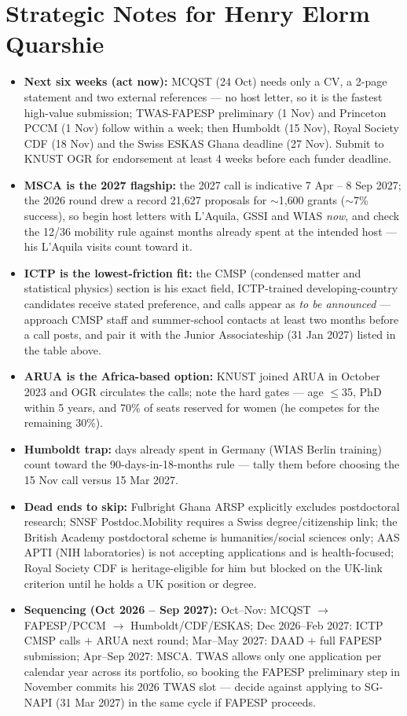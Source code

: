\documentclass[11pt,a4paper]{article}
\begin{document}
\section{Strategic Notes for Henry Elorm Quarshie}

\begin{itemize}[leftmargin=1.4em]
  \item \textbf{Next six weeks (act now):} MCQST (24 Oct) needs only a CV, a 2-page statement and two external references --- no host letter, so it is the fastest high-value submission; TWAS-FAPESP preliminary (1 Nov) and Princeton PCCM (1 Nov) follow within a week; then Humboldt (15 Nov), Royal Society CDF (18 Nov) and the Swiss ESKAS Ghana deadline (27 Nov). Submit to KNUST OGR for endorsement at least 4 weeks before each funder deadline.
  \item \textbf{MSCA is the 2027 flagship:} the 2027 call is indicative 7 Apr -- 8 Sep 2027; the 2026 round drew a record 21{,}627 proposals for $\sim$1{,}600 grants ($\sim$7\% success), so begin host letters with L'Aquila, GSSI and WIAS \emph{now}, and check the 12/36 mobility rule against months already spent at the intended host --- his L'Aquila visits count toward it.
  \item \textbf{ICTP is the lowest-friction fit:} the CMSP (condensed matter and statistical physics) section is his exact field, ICTP-trained developing-country candidates receive stated preference, and calls appear as \emph{to be announced} --- approach CMSP staff and summer-school contacts at least two months before a call posts, and pair it with the Junior Associateship (31 Jan 2027) listed in the table above.
  \item \textbf{ARUA is the Africa-based option:} KNUST joined ARUA in October 2023 and OGR circulates the calls; note the hard gates --- age $\leq$35, PhD within 5 years, and 70\% of seats reserved for women (he competes for the remaining 30\%).
  \item \textbf{Humboldt trap:} days already spent in Germany (WIAS Berlin training) count toward the 90-days-in-18-months rule --- tally them before choosing the 15 Nov call versus 15 Mar 2027.
  \item \textbf{Dead ends to skip:} Fulbright Ghana ARSP explicitly excludes postdoctoral research; SNSF Postdoc.Mobility requires a Swiss degree/citizenship link; the British Academy postdoctoral scheme is humanities/social sciences only; AAS APTI (NIH laboratories) is not accepting applications and is health-focused; Royal Society CDF is heritage-eligible for him but blocked on the UK-link criterion until he holds a UK position or degree.
  \item \textbf{Sequencing (Oct 2026 -- Sep 2027):} Oct--Nov: MCQST $\rightarrow$ FAPESP/PCCM $\rightarrow$ Humboldt/CDF/ESKAS; Dec 2026--Feb 2027: ICTP CMSP calls $+$ ARUA next round; Mar--May 2027: DAAD $+$ full FAPESP submission; Apr--Sep 2027: MSCA. TWAS allows only one application per calendar year across its portfolio, so booking the FAPESP preliminary step in November commits his 2026 TWAS slot --- decide against applying to SG-NAPI (31 Mar 2027) in the same cycle if FAPESP proceeds.
\end{itemize}
\end{document}
